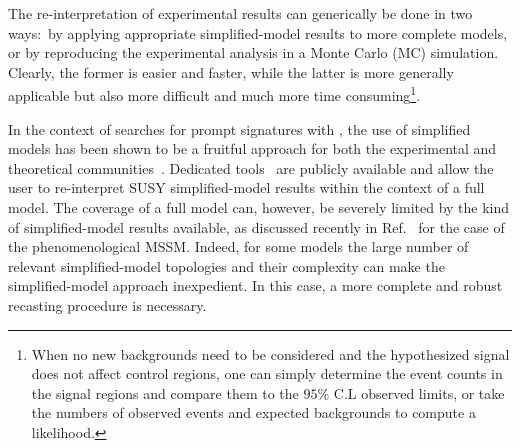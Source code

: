 The re-interpretation of experimental results can generically be done in two ways:~by applying
appropriate simplified-model results to more complete models, or by reproducing the experimental analysis in a Monte Carlo (MC) simulation. 
Clearly,  the former is easier and faster, 
while the latter is more generally applicable but also more difficult and much more time consuming\footnote{When no new backgrounds 
need to be considered and the hypothesized signal does not affect control regions, one can simply determine the 
event counts in the signal regions and compare them to the $95\%$ C.L observed limits, or take the numbers of observed events and expected backgrounds to compute a likelihood.}. 

In the context of searches for prompt signatures with \MET, the use of simplified models has been shown to be a fruitful approach for both the experimental and theoretical communities~\cite{ArkaniHamed:2007fw, Alwall:2008ag, Alves:2011wf, Okawa:2011xg,Chatrchyan:2013sza,Abercrombie:2015wmb,Boveia:2016mrp}. 
Dedicated tools~\cite{Kraml:2013mwa,Ambrogi:2017neo,Papucci:2014rja} are publicly 
available and allow the user to re-interpret SUSY simplified-model results within the context of a full model.
The coverage of a full model can, however, be severely limited by the kind of simplified-model results available, 
as discussed recently in Ref.~\cite{Ambrogi:2017lov} for the case of the phenomenological MSSM.
Indeed, for some models the large number of relevant simplified-model topologies and their complexity
can make the simplified-model approach inexpedient. 
In this case, a more complete and robust recasting procedure is necessary. 

